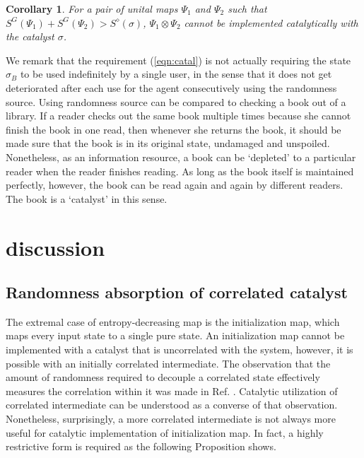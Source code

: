 \documentclass[aps, reprint, amsmath,amssymb, prx, superscriptaddress]{revtex4-2}
\newtheorem{corollary}[theorem]{Corollary}
\begin{document}
\begin{corollary}
    For a pair of unital maps $\Psi_1$ and $\Psi_2$ such that $S^G(\Psi_1)+S^G(\Psi_2)>S^\diamond(\sigma)$, $\Psi_1\otimes \Psi_2$ cannot be implemented catalytically with the catalyst $\sigma$.
\end{corollary}

We remark that the requirement (\ref{eqn:catal}) is not actually requiring the state $\sigma_B$ to be used indefinitely by a single user, in the sense that it does not get deteriorated after each use for the agent consecutively using the randomness source. Using randomness source can be compared to checking a book out of a library. If a reader checks out the same book multiple times because she cannot finish the book in one read, then whenever she returns the book, it should be made sure that the book is in its original state, undamaged and unspoiled. Nonetheless, as an information resource, a book can be `depleted' to a particular reader when the reader finishes reading. As long as the book itself is maintained perfectly, however, the book can be read again and again by different readers. The book is a `catalyst' in this sense.

\section{discussion} \label{sec:discussion}

\subsection{Randomness absorption of correlated catalyst} \label{subsec:absorption}
The extremal case of entropy-decreasing map is the initialization map, which maps every input state to a single pure state. An initialization map cannot be implemented with a catalyst that is uncorrelated with the system, however, it is possible with an initially correlated intermediate. The observation that the amount of randomness required to decouple a correlated state effectively measures the correlation within it was made in Ref. \cite{groisman2005quantum}. Catalytic utilization of correlated intermediate can be understood as a converse of that observation. Nonetheless, surprisingly, a more correlated intermediate is not always more useful for catalytic implementation of initialization map. In fact, a highly restrictive form is required as the following Proposition shows.
\end{document}
